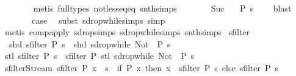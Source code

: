 \begin{isabellebody}
\ \ \ \ \ \ \isamarkupfalse%
\ {\isacharparenleft}metis\ {\isacharparenleft}full{\isacharunderscore}types{\isacharparenright}\ not{\isacharunderscore}less{\isacharunderscore}eq{\isacharunderscore}eq\ snth{\isachardot}simps{\isacharparenleft}{}{\isacharparenright}{\isacharparenright}\isanewline
\ \ \ \ \isamarkupfalse%
\ \isamarkupfalse%
\ Suc{\isacharparenleft}{}{\isacharparenright}\ \isamarkupfalse%
\ {\isachardoublequoteopen}{\isasymnot}\ {\isacharparenleft}P\ {\isacharparenleft}s\ {\isacharbang}{\isacharbang}\ {}{\isacharparenright}{\isacharparenright}{\isachardoublequoteclose}\ \isamarkupfalse%
\ blast\isanewline
\ \ \ \ \isamarkupfalse%
\ \isamarkupfalse%
\ {\isacharquery}case\ \isamarkupfalse%
\ {\isacharparenleft}subst\ sdrop{\isacharunderscore}while{\isachardot}simps{\isacharparenright}\ simp\isanewline
\ \ \isamarkupfalse%
\ {\isacharparenleft}metis\ comp{\isacharunderscore}apply\ sdrop{\isachardot}simps{\isacharparenleft}{}{\isacharparenright}\ sdrop{\isacharunderscore}while{\isachardot}simps\ snth{\isachardot}simps{\isacharparenleft}{}{\isacharparenright}{\isacharparenright}\isanewline
{}\isamarkupfalse%
%
\endisatagproof
{\isafoldproof}%
%
\isadelimproof
\isanewline
%
\endisadelimproof
\isanewline
{}\isamarkupfalse%
\ sfilter\ \isanewline
\ \ {\isachardoublequoteopen}shd\ {\isacharparenleft}sfilter\ P\ s{\isacharparenright}\ {\isacharequal}\ shd\ {\isacharparenleft}sdrop{\isacharunderscore}while\ {\isacharparenleft}Not\ {\isasymcirc}\ P{\isacharparenright}\ s{\isacharparenright}{\isachardoublequoteclose}\isanewline
{\isacharbar}\ {\isachardoublequoteopen}stl\ {\isacharparenleft}sfilter\ P\ s{\isacharparenright}\ {\isacharequal}\ sfilter\ P\ {\isacharparenleft}stl\ {\isacharparenleft}sdrop{\isacharunderscore}while\ {\isacharparenleft}Not\ {\isasymcirc}\ P{\isacharparenright}\ s{\isacharparenright}{\isacharparenright}{\isachardoublequoteclose}\isanewline
\isanewline
{}\isamarkupfalse%
\ sfilter{\isacharunderscore}Stream{\isacharcolon}\ {\isachardoublequoteopen}sfilter\ P\ {\isacharparenleft}x\ {\isacharhash}{\isacharhash}\ s{\isacharparenright}\ {\isacharequal}\ {\isacharparenleft}if\ P\ x\ then\ x\ {\isacharhash}{\isacharhash}\ sfilter\ P\ s\ else\ sfilter\ P\ s{\isacharparenright}{\isachardoublequoteclose}\isanewline
%
\isadelimproof
%
\endisadelimproof
%
\isatagproof

\end{isabellebody}
